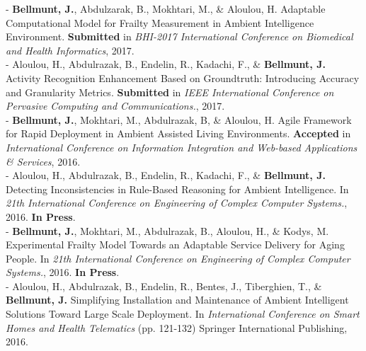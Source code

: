 \documentclass[paper=a4,fontsize=11pt]{temp} %
\begin{document}
\hspace{3mm}
\begin{minipage}{0.04\linewidth}
        \hspace{\linewidth}
		\end{minipage}%
   \begin{minipage}{0.88\linewidth}
   
   \textbf{\color{subheadings}{PUBLICATIONS}}
   \vspace{1ex}
   
    - \textbf{Bellmunt, J.}, Abdulzarak, B., Mokhtari, M., \& Aloulou, H. Adaptable Computational Model for Frailty Measurement in Ambient Intelligence Environment. \textbf{Submitted} in \textit{BHI-2017 International Conference on Biomedical and Health Informatics}, 2017.\\
    
 - Aloulou, H., Abdulrazak, B., Endelin, R., Kadachi, F., \& \textbf{Bellmunt, J.}  Activity Recognition Enhancement Based on Groundtruth: Introducing Accuracy and Granularity Metrics. \textbf{Submitted} in \textit{IEEE International Conference on Pervasive Computing and Communications.}, 2017.\\

- \textbf{Bellmunt, J.}, Mokhtari, M., Abdulrazak, B, \& Aloulou, H.  Agile Framework for Rapid Deployment in Ambient Assisted Living Environments. \textbf{Accepted} in \textit{International Conference on Information Integration and Web-based Applications \& Services}, 2016.\\

 - Aloulou, H., Abdulrazak, B., Endelin, R., Kadachi, F., \& \textbf{Bellmunt, J.} Detecting Inconsistencies in Rule-Based Reasoning for Ambient Intelligence. In \textit{21th International Conference on Engineering of Complex Computer Systems.}, 2016. \textbf{In Press}.\\

 - \textbf{Bellmunt, J.}, Mokhtari, M., Abdulrazak, B., Aloulou, H., \& Kodys, M. Experimental Frailty Model Towards an Adaptable Service Delivery for Aging People. In \textit{21th International Conference on Engineering of Complex Computer Systems.}, 2016. \textbf{In Press}.\\

 - Aloulou, H., Abdulrazak, B., Endelin, R., Bentes, J., Tiberghien, T., \& \textbf{Bellmunt, J.} Simplifying Installation and Maintenance of Ambient Intelligent Solutions Toward Large Scale Deployment. In \textit{International Conference on Smart Homes and Health Telematics} (pp. 121-132) Springer International Publishing, 2016.\\


\end{minipage}
\end{document}
